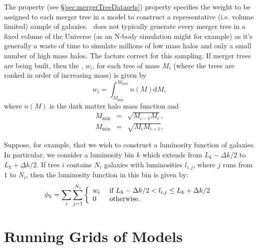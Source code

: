 The  property (see \S\ref{sec:mergerTreeDatasets}) property specifies the weight to be assigned to each merger tree in a model to construct a representative (i.e. volume limited) sample of galaxies. \glc\ does not typically generate every merger tree in a fixed volume of the Universe (as an N-body simulation might for example) as it's generally a waste of time to simulate millions of low mass halos and only a small number of high mass halos. The  factors correct for this sampling. If merger trees are being built, then the , $w_i$, for each tree of mass $M_i$ (where the trees are ranked in order of increasing mass) is given by
\begin{equation}
 w_i = \int_{M_\mathrm{min}}^{M_\mathrm{max}} n(M) \mathrm{d}M,
\end{equation}
where $n(M)$ is the dark matter halo mass function and
\begin{eqnarray}
 M_\mathrm{min} &=& \sqrt{M_{i-1}M_i}, \\
 M_\mathrm{min} &=& \sqrt{M_i M_{i+1}}.
\end{eqnarray}

Suppose, for example, that we wish to construct a luminosity function of galaxies. In particular, we consider a luminosity bin $k$ which extends from $L_k-\Delta k/2$ to $L_k+\Delta k/2$. If tree $i$ contains $N_i$ galaxies with luminosities $l_{i,j}$, where $j$ runs from $1$ to $N_i$, then the luminosity function in this bin is given by:
\begin{equation}
 \phi_k = \sum_i \sum_{j=1}^{N_i} \left\{ \begin{array}{ll} w_i & \hbox{ if  } L_k-\Delta k/2 < l_{i,j} \le L_k+\Delta k/2 \\ 0 & \hbox{ otherwise.} \end{array} \right.
\end{equation}

\section{Running Grids of Models}\label{sec:RunningGrids}

